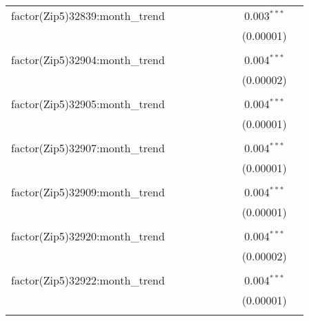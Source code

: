 \begin{table}[H]
{\begin{tabular}{@{\extracolsep{5pt}}lcccccccc}
  factor(Zip5)32839:month\_trend &  &  &  &  &  &  & 0.003$^{***}$ &  \\  

   &  &  &  &  &  &  & (0.00001) &  \\  

   & & & & & & & & \\  

  factor(Zip5)32904:month\_trend &  &  &  &  &  &  & 0.004$^{***}$ &  \\  

   &  &  &  &  &  &  & (0.00002) &  \\  

   & & & & & & & & \\  

  factor(Zip5)32905:month\_trend &  &  &  &  &  &  & 0.004$^{***}$ &  \\  

   &  &  &  &  &  &  & (0.00001) &  \\  

   & & & & & & & & \\  

  factor(Zip5)32907:month\_trend &  &  &  &  &  &  & 0.004$^{***}$ &  \\  

   &  &  &  &  &  &  & (0.00001) &  \\  

   & & & & & & & & \\  

  factor(Zip5)32909:month\_trend &  &  &  &  &  &  & 0.004$^{***}$ &  \\  

   &  &  &  &  &  &  & (0.00001) &  \\  

   & & & & & & & & \\  

  factor(Zip5)32920:month\_trend &  &  &  &  &  &  & 0.004$^{***}$ &  \\  

   &  &  &  &  &  &  & (0.00002) &  \\  

   & & & & & & & & \\  

  factor(Zip5)32922:month\_trend &  &  &  &  &  &  & 0.004$^{***}$ &  \\  

   &  &  &  &  &  &  & (0.00001) &  \\  

   & & & & & & & & \\  


\end{tabular}}
\end{table}
